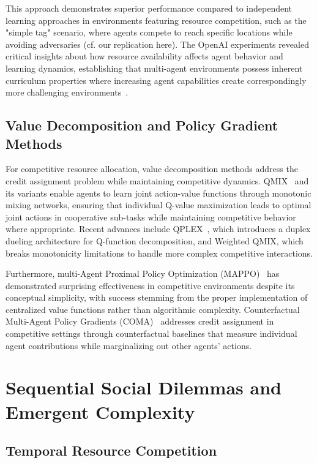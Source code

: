 This approach demonstrates superior performance compared to independent learning approaches in environments featuring resource competition, such as the "simple tag" scenario, where agents compete to reach specific locations while avoiding adversaries (cf. our replication here). The OpenAI experiments revealed critical insights about how resource availability affects agent behavior and learning dynamics, establishing that multi-agent environments possess inherent curriculum properties where increasing agent capabilities create correspondingly more challenging environments~\autocite{lowe_learning_2017}.

\subsection{Value Decomposition and Policy Gradient Methods}

For competitive resource allocation, value decomposition methods address the credit assignment problem while maintaining competitive dynamics. QMIX~\autocite{rashid_monotonic_2020} and its variants enable agents to learn joint action-value functions through monotonic mixing networks, ensuring that individual Q-value maximization leads to optimal joint actions in cooperative sub-tasks while maintaining competitive behavior where appropriate. Recent advances include QPLEX~\autocite{wang_qplex_2021}, which introduces a duplex dueling architecture for Q-function decomposition, and Weighted QMIX, which breaks monotonicity limitations to handle more complex competitive interactions.

Furthermore, multi-Agent Proximal Policy Optimization (MAPPO)~\autocite{yu_surprising_2022} has demonstrated surprising effectiveness in competitive environments despite its conceptual simplicity, with success stemming from the proper implementation of centralized value functions rather than algorithmic complexity. Counterfactual Multi-Agent Policy Gradients (COMA)~\autocite{foerster_counterfactual_2018} addresses credit assignment in competitive settings through counterfactual baselines that measure individual agent contributions while marginalizing out other agents' actions.

\section{Sequential Social Dilemmas and Emergent Complexity}

\subsection{Temporal Resource Competition}

